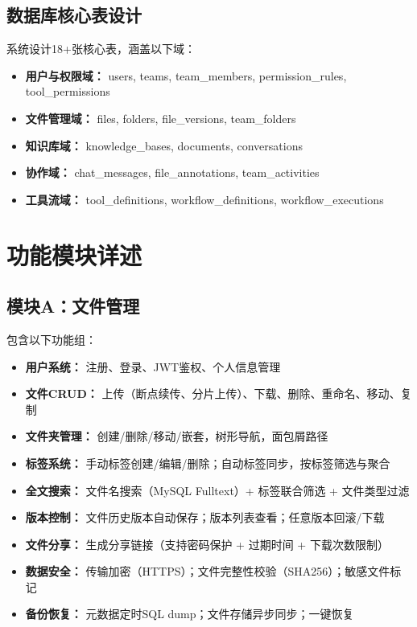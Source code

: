 \documentclass[a4paper,zihao=-4]{ctexart}
\begin{document}
\subsection{数据库核心表设计}

系统设计18+张核心表，涵盖以下域：

\begin{itemize}
  \item \textbf{用户与权限域：} users, teams, team\_members, permission\_rules,
        tool\_permissions
  \item \textbf{文件管理域：} files, folders, file\_versions, team\_folders
  \item \textbf{知识库域：} knowledge\_bases, documents, conversations
  \item \textbf{协作域：} chat\_messages, file\_annotations, team\_activities
  \item \textbf{工具流域：} tool\_definitions, workflow\_definitions,
        workflow\_executions
\end{itemize}


\section{功能模块详述}

\subsection{模块A：文件管理}

包含以下功能组：

\begin{itemize}
  \item \textbf{用户系统：} 注册、登录、JWT鉴权、个人信息管理
  \item \textbf{文件CRUD：} 上传（断点续传、分片上传）、下载、删除、重命名、移动、复制
  \item \textbf{文件夹管理：} 创建/删除/移动/嵌套，树形导航，面包屑路径
  \item \textbf{标签系统：} 手动标签创建/编辑/删除；自动标签同步，按标签筛选与聚合
  \item \textbf{全文搜索：} 文件名搜索（MySQL Fulltext）+ 标签联合筛选 + 文件类型过滤
  \item \textbf{版本控制：} 文件历史版本自动保存；版本列表查看；任意版本回滚/下载
  \item \textbf{文件分享：} 生成分享链接（支持密码保护 + 过期时间 + 下载次数限制）
  \item \textbf{数据安全：} 传输加密（HTTPS）；文件完整性校验（SHA256）；敏感文件标记
  \item \textbf{备份恢复：} 元数据定时SQL dump；文件存储异步同步；一键恢复
\end{itemize}
\end{document}
